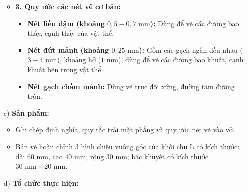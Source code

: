 \documentclass[12pt, a4paper]{article}
\begin{document}
\begin{itemize}[leftmargin=1.2cm]
\begin{itemize}[leftmargin=0.6cm]
        \item \textbf{3. Quy ước các nét vẽ cơ bản:}
        \begin{itemize}
            \item \textbf{Nét liền đậm (khoảng $0{,}5 - 0{,}7\text{ mm}$):} Dùng để vẽ các đường bao thấy, cạnh thấy của vật thể.
            \item \textbf{Nét đứt mảnh (khoảng $0{,}25\text{ mm}$):} Gồm các gạch ngắn đều nhau ($3 - 4\text{ mm}$), khoảng hở ($1\text{ mm}$), dùng để vẽ các đường bao khuất, cạnh khuất bên trong vật thể.
            \item \textbf{Nét gạch chấm mảnh:} Dùng vẽ trục đối xứng, đường tâm đường tròn.
        \end{itemize}
    \end{itemize}

    \item[c)] \textbf{Sản phẩm:}
    \begin{itemize}[leftmargin=0.6cm]
        \item Ghi chép định nghĩa, quy tắc trải mặt phẳng và quy ước nét vẽ vào vở.
        \item Bản vẽ hoàn chỉnh 3 hình chiếu vuông góc của khối chữ L có kích thước: dài $60\text{ mm}$, cao $40\text{ mm}$, rộng $30\text{ mm}$; bậc khuyết có kích thước $30\text{ mm} \times 20\text{ mm}$.
    \end{itemize}

    \item[d)] \textbf{Tổ chức thực hiện:}
\end{itemize}
\end{document}
